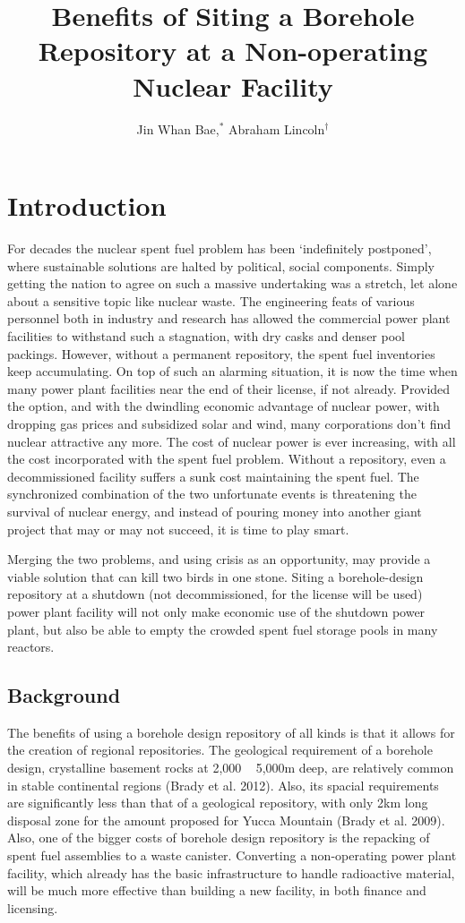 \documentclass{anstrans}
\title{Benefits of Siting a Borehole Repository at a Non-operating Nuclear 
Facility}
\author{Jin Whan Bae,$^{*}$ Abraham Lincoln$^{\dagger}$}
\institute{
$^{*}$Dept. of Nuclear Plasma, and Radiological Engineering, University of Illinois at Urbana-Champaign, Urbana, IL
\and
$^{\dagger}$State Capitol Building, Springfield, IL
}
\begin{document}
\section{Introduction}

For decades the nuclear spent fuel problem has been ‘indefinitely postponed’, where sustainable solutions are halted by political, social components. Simply getting the nation to agree on such a massive undertaking was a stretch, let alone about a sensitive topic like nuclear waste. The engineering feats of various personnel both in industry and research has allowed the commercial power plant facilities to withstand such a stagnation, with dry casks and denser pool packings. However, without a permanent repository, the spent fuel inventories keep accumulating.
On top of such an alarming situation, it is now the time when many power plant facilities near the end of their license, if not already. Provided the option, and with the dwindling economic advantage of nuclear power, with dropping gas prices and subsidized solar and wind, many corporations don’t find nuclear attractive any more. The cost of nuclear power is ever increasing, with all the cost incorporated with the spent fuel problem. Without a repository, even a decommissioned facility suffers a sunk cost maintaining the spent fuel.
The synchronized combination of the two unfortunate events is threatening the survival of nuclear energy, and instead of pouring money into another giant project that may or may not succeed, it is time to play smart.

Merging the two problems, and using crisis as an opportunity, may provide a viable solution that can kill two birds in one stone.
Siting a borehole-design repository at a shutdown (not decommissioned, for the license will be used) power plant facility will not only make economic use of the shutdown power plant, but also be able to empty the crowded spent fuel storage pools in many reactors.


\subsection{Background}

The benefits of using a borehole design repository of all kinds is that it allows for the creation of regional repositories. The geological requirement of a borehole design, crystalline basement rocks at 2,000 ~ 5,000m deep, are relatively common in stable continental regions (Brady et al. 2012). Also, its spacial requirements are significantly less than that of a geological repository, with only 2km long disposal zone for the amount proposed for Yucca Mountain (Brady et al. 2009). 
Also, one of the bigger costs of borehole design repository is the repacking of spent fuel assemblies to a waste canister. Converting a non-operating power plant facility, which already has the basic infrastructure to handle radioactive material, will be much more effective than building a new facility, in both finance and licensing. 
\end{document}
